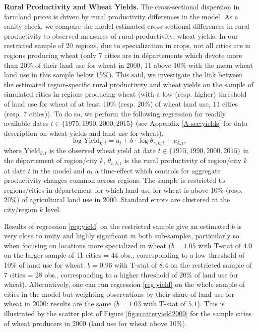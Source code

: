 \documentclass[11pt]{report}
\begin{document}
\textbf{Rural Productivity and Wheat Yields.} The cross-sectional dispersion in farmland prices is driven by rural productivity differences in the model. As a sanity check, we compare the model estimated cross-sectional differences in rural productivity to observed measures of rural productivity: wheat yields. In our restricted sample of 20 regions, due to specialization in crops, not all cities are in regions producing wheat (only 7 cities are in départements which devote more than 20\% of their land use for wheat in 2000, 11 above 10\% with the mean wheat land use in this sample below 15\%). This said, we investigate the link between the estimated region-specific rural productivity and wheat yields on the sample of simulated cities in regions producing wheat (with a low (resp. higher) threshold of land use for wheat of at least 10\% (resp. 20\%) of wheat land use, 11 cities (resp. 7 cities)). To do so, we perform the following regression for readily available dates $t \in \{1975, 1990, 2000, 2015\}$ (see Appendix \ref{A-sec:yields} for data description on wheat yields and land use for wheat),
\begin{equation}
\log \text{Yield}_{k,t} = a_t + b \cdot \log \theta_{r,k,t} + u_{k,t},
\label{reg:yield}
\end{equation}
where $\text{Yield}_{k,t}$ is the observed wheat yield at date $t \in \{1975, 1990, 2000, 2015\}$ in the département of region/city $k$, $\theta_{r,k,t}$ is the rural productivity of region/city $k$ at date $t$ in the model and $a_t$ a time-effect which controls for aggregate productivity changes common across regions. The sample is restricted to regions/cities in département for which land use for wheat is above 10\% (resp. 20\%) of agricultural land use in 2000. Standard errors are clustered at the city/region $k$ level. 

Results of regression \ref{reg:yield} on the restricted sample give an estimated $b$ is very close to unity and highly significant in both sub-samples, particularly so when focusing on locations more specialized in wheat ($b=1.05$ with T-stat of $4.0$ on the larger sample of 11 cities = 44 obs., corresponding to a low threshold of 10\% of land use for wheat;  $b=0.96$ with T-stat of $8.4$ on the restricted sample of 7 cities = 28 obs., corresponding to a higher threshold of 20\% of land use for wheat). Alternatively, one can run regression \ref{reg:yield} on the whole sample of cities in the model but weighting observations by their share of land use for wheat in 2000: results are the same ($b=1.03$ with T-stat of $5.1$). This is illustrated by the scatter plot of Figure \ref{fig:scatteryield2000} for the sample cities of wheat producers in 2000 (land use for wheat above 10\%).
\end{document}
